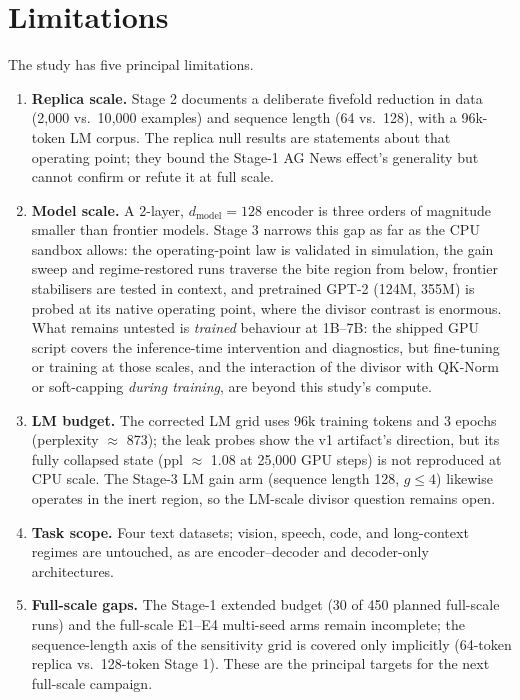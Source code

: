 \section{Limitations}\label{sec:limitations}
The study has five principal limitations.
\begin{enumerate}[leftmargin=1.9em]
  \item \textbf{Replica scale.} Stage 2 documents a deliberate fivefold
        reduction in data (2{,}000 vs.\ 10{,}000 examples) and sequence length
        (64 vs.\ 128), with a 96k-token LM corpus. The replica null results are
        statements about that operating point; they bound the Stage-1 AG News
        effect's generality but cannot confirm or refute it at full scale.
  \item \textbf{Model scale.} A 2-layer, $d_{\text{model}} = 128$ encoder is
        three orders of magnitude smaller than frontier models. Stage 3
        narrows this gap as far as the CPU sandbox allows: the operating-point
        law is validated in simulation, the gain sweep and regime-restored
        runs traverse the bite region from below, frontier stabilisers are
        tested in context, and pretrained GPT-2 (124M, 355M) is probed at its
        native operating point, where the divisor contrast is enormous.
        What remains untested is \emph{trained} behaviour at 1B--7B: the
        shipped GPU script covers the inference-time intervention and
        diagnostics, but fine-tuning or training at those scales, and the
        interaction of the divisor with QK-Norm or soft-capping \emph{during
        training}, are beyond this study's compute.
  \item \textbf{LM budget.} The corrected LM grid uses 96k training tokens and
        3 epochs (perplexity $\approx$ 873); the leak probes show the v1
        artifact's direction, but its fully collapsed state (ppl $\approx$ 1.08
        at 25{,}000 GPU steps) is not reproduced at CPU scale. The Stage-3 LM
        gain arm (sequence length 128, $g \le 4$) likewise operates in the
        inert region, so the LM-scale divisor question remains open.
  \item \textbf{Task scope.} Four text datasets; vision, speech, code, and
        long-context regimes are untouched, as are encoder--decoder and
        decoder-only architectures.
  \item \textbf{Full-scale gaps.} The Stage-1 extended budget (30 of 450
        planned full-scale runs) and the full-scale E1--E4 multi-seed arms
        remain incomplete; the sequence-length axis of the sensitivity grid is
        covered only implicitly (64-token replica vs.\ 128-token Stage 1).
        These are the principal targets for the next full-scale campaign.
\end{enumerate}

